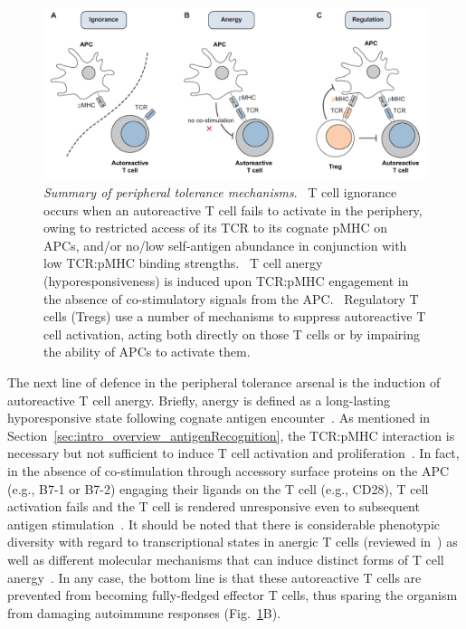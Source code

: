 \begin{figure}
    \centering
    \includegraphics[width=\textwidth]{Figures/intro/fig4_peripheralTolerance.pdf}
    \caption[Summary of peripheral tolerance mechanisms]{%
    \textit{Summary of peripheral tolerance mechanisms}. %
    ~T cell ignorance occurs when an autoreactive T cell fails to activate in the periphery, owing to restricted access of its TCR to its cognate pMHC on APCs, and/or no/low self-antigen abundance in conjunction with low TCR:pMHC binding strengths. %
    ~T cell anergy (hyporesponsiveness) is induced upon TCR:pMHC engagement in the absence of co-stimulatory signals from the APC. %
    ~Regulatory T cells (Tregs) use a number of mechanisms to suppress autoreactive T cell activation, acting both directly on those T cells or by impairing the ability of APCs to activate them.}
    \label{fig:intro_peripheralTolerance}
\end{figure}

The next line of defence in the peripheral tolerance arsenal is the induction of autoreactive T cell anergy. Briefly, anergy is defined as a long-lasting hyporesponsive state following cognate antigen encounter~\cite{schwartz1989t,schwartz2003t,appleman2003t,eltanbouly2021rethinking}. As mentioned in Section~\ref{sec:intro_overview_antigenRecognition}, the TCR:pMHC interaction is necessary but not sufficient to induce T cell activation and proliferation~\cite{lafferty1978immunological,mueller1989accessory}. In fact, in the absence of co-stimulation through accessory surface proteins on the APC (e.g., B7-1 or B7-2) engaging their ligands on the T cell (e.g., CD28), T cell activation fails and the T cell is rendered unresponsive even to subsequent antigen stimulation~\cite{ragazzo2001costimulation,wells2001signaling}. It should be noted that there is considerable phenotypic diversity with regard to transcriptional states in anergic T cells (reviewed in~\cite{valdor2013induction}) as well as different molecular mechanisms that can induce distinct forms of T cell anergy~\cite{wells2001signaling}. In any case, the bottom line is that these autoreactive T cells are prevented from becoming fully-fledged effector T cells, thus sparing the organism from damaging autoimmune responses (Fig.~\ref{fig:intro_peripheralTolerance}B).

